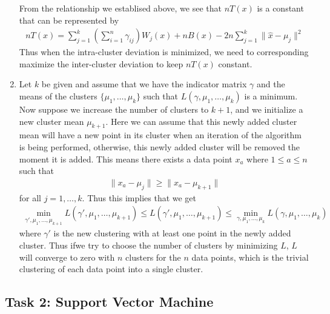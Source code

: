 \documentclass[a4paper,10pt]{article}
\theoremstyle{definition}
\begin{document}
\begin{enumerate}
From the relationship we establised above, we see that $nT(x)$ is a constant that can be represented by
\begin{align*}
nT(x) = \sum_{j=1}^{k}\left(\sum_{i=1}^{n}\gamma_{ij}\right)W_j(x) + nB(x) -2n\sum_{j=1}^{k}\lVert\hat{x}-\mu_j\rVert^2
\end{align*}
Thus when the intra-cluster deviation is minimized, we need to corresponding maximize the inter-cluster deviation to keep $nT(x)$ constant.



\item Let $k$ be given and assume that we have the indicator matrix $\gamma$ and the means of the clusters $\{\mu_1,\ldots,\mu_k\}$ such that $L(\gamma, \mu_1,\ldots, \mu_k)$ is a minimum. Now suppose we increase the number of clusters to $k+1$, and we initialize a new cluster mean $\mu_{k+1}$. Here we can assume that this newly added cluster mean will have a new point in its cluster when an iteration of the algorithm is being performed, otherwise, this newly added cluster will be removed the moment it is added. This means there exists a data point $x_a$ where $1\leq a \leq n$  such that 
\begin{align*}
\lVert x_a - \mu_j\rVert \geq \lVert x_a - \mu_{k+1}\rVert
\end{align*}
for all $j = 1, \ldots, k$. Thus this implies that we get 
\begin{align*}
\min_{\gamma', \mu_1, \ldots, \mu_{k+1}}L(\gamma', \mu_1, \ldots, \mu_{k+1}) \leq L(\gamma', \mu_1, \ldots, \mu_{k+1}) \leq \min_{\gamma, \mu_1, \ldots, \mu_{k}}L(\gamma, \mu_1, \ldots, \mu_{k}) 
\end{align*}
where $\gamma'$ is the new clustering with at least one point in the newly added cluster. Thus ifwe try to choose the number of clusters by minimizing $L$, $L$ will converge to zero with $n$ clusters for the $n$ data points, which is the trivial clustering of each data point into a single cluster. 

\end{enumerate}

\subsection*{Task 2: Support Vector Machine}
\end{document}
